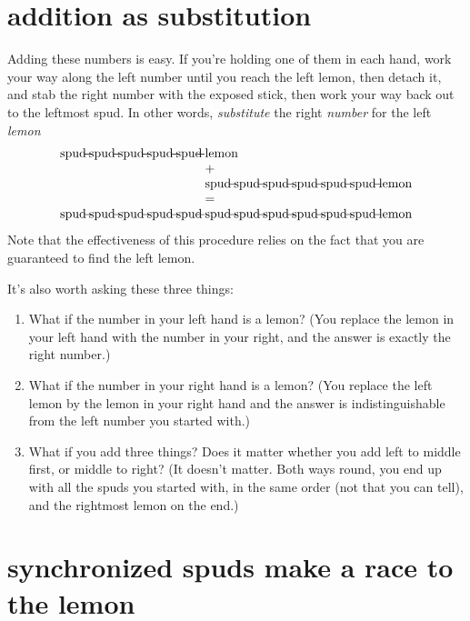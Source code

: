\documentclass{book}
\begin{document}
\section{addition as substitution}

Adding these numbers is easy. If you're holding one of them in each hand, work your way along the left number until you reach the left lemon, then detach it, and stab the right number with the exposed stick, then work your way back out to the leftmost spud. In other words, \emph{substitute} the right \emph{number} for the left \emph{lemon}
\[\begin{array}{l@{\;\,}l}
\spud\spud\spud\spud\spud&\lemon\\
&+ \\
&\spud\spud\spud\spud\spud\spud\lemon\\
&= \\
\spud\spud\spud\spud\spud&\spud\spud\spud\spud\spud\spud\lemon\\
\end{array}
\]
Note that the effectiveness of this procedure relies on the fact that you are guaranteed to find the left lemon.

It's also worth asking these three things:
\begin{enumerate}
\item What if the number in your left hand is a lemon? (You replace the lemon in your left hand with the number in your right, and the answer is exactly the right number.)
\item What if the number in your right hand is a lemon? (You replace the left lemon by the lemon in your right hand and the answer is indistinguishable from the left number you started with.)
\item What if you add three things? Does it matter whether you add left to middle first, or middle to right? (It doesn't matter. Both ways round, you end up with all the spuds you started with, in the same order (not that you can tell), and the rightmost lemon on the end.)
\end{enumerate}


\section{synchronized spuds make a race to the lemon}
\end{document}
